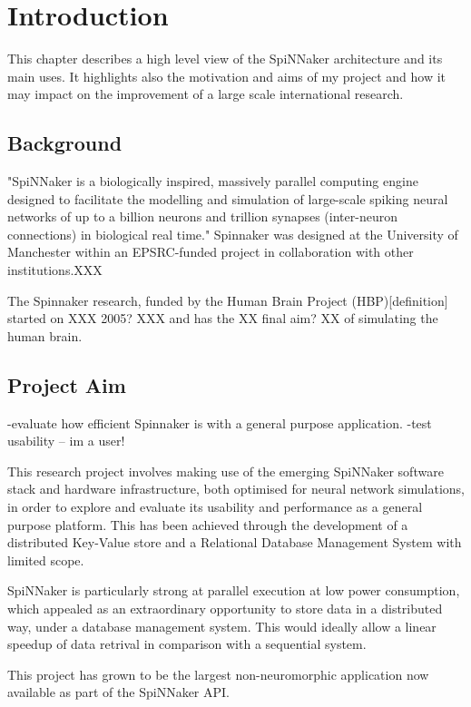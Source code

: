 \chapter{Introduction}
\label{cha:intro}

This chapter describes a high level view of the SpiNNaker architecture and its main uses. It highlights also the motivation and aims of my project and how it may impact on the improvement of a large scale international research.

\section{Background}
\label{sec:background}

"SpiNNaker is a biologically inspired, massively parallel computing engine designed to facilitate the modelling and simulation of large-scale spiking neural networks of up to a billion neurons and trillion synapses (inter-neuron connections) in biological real time."\cite{painkras} Spinnaker was designed at the University of Manchester within an EPSRC-funded project in collaboration with other institutions.XXX

The Spinnaker research, funded by the Human Brain Project (HBP)[definition] started on XXX 2005? XXX and has the XX final aim? XX of simulating the human brain.

\section{Project Aim}
\label{sec:aim}


-evaluate how efficient Spinnaker is with a general purpose application.
-test usability -- im a user! 

This research project involves making use of the emerging SpiNNaker software stack and hardware infrastructure, both optimised for neural network simulations, in order to explore and evaluate its usability and performance as a general purpose platform. This has been achieved through the development of a distributed Key-Value store and a Relational Database Management System with limited scope.

SpiNNaker is particularly strong at parallel execution at low power consumption, which appealed as an extraordinary opportunity to store data in a distributed way, under a database management system. This would ideally allow a linear speedup of data retrival in comparison with a sequential system.

This project has grown to be the largest non-neuromorphic application now available as part of the SpiNNaker API.

